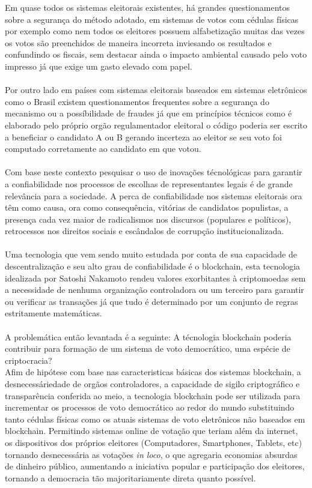 Em quase todos os sistemas eleitorais existentes, há grandes questionamentos sobre
a segurança do método adotado, em sistemas de votos com cédulas físicas por exemplo
como nem todos os eleitores possuem alfabetização muitas das vezes os votos são
preenchidos de maneira incorreta inviesando os resultados e confundindo os fiscais, 
sem destacar ainda o impacto ambiental causado pelo voto impresso já que exige
um gasto elevado com papel.\\ \\
Por outro lado em países com sistemas eleitorais baseados em sistemas eletrônicos
como o Brasil existem questionamentos frequentes sobre a segurança do mecanismo 
ou a possíbilidade de fraudes já que em princípios técnicos como é elaborado
pelo próprio orgão regulamentador eleitoral o código poderia ser escrito a 
beneficiar o candidato A ou B gerando incerteza ao eleitor se seu voto
foi computado corretamente ao candidato em que votou. \\ \\
Com base neste contexto pesquisar o uso de inovações técnológicas para garantir a 
confiabilidade nos processos de escolhas de representantes legais é de grande relevância
para a sociedade. A perca de confiabilidade nos sistemas eleitorais ora têm como
causa, ora como consequência, vitórias de candidatos populistas, a presença cada
vez maior de radicalismos nos discursos (populares e políticos), retrocessos nos
direitos sociais e escândalos de corrupção institucionalizada. \\ \\
Uma tecnologia que vem sendo muito estudada por conta de sua capacidade de 
descentralização e seu alto grau de confiabilidade é o blockchain, esta tecnologia
idealizada por Satoshi Nakamoto \cite[Bitcoin P2P e-cash paper]{nakamoto2008re}
rendeu valores exorbitantes à criptomoedas sem a necessidade de nenhuma organização
controladora ou um terceiro para garantir ou verificar as transações já que tudo
é determinado por um conjunto de regras estritamente matemáticas. \\ \\
A problemática então levantada é a seguinte: A técnologia blockchain poderia contribuir
para formação de um sistema de voto democrático, uma espécie de criptocracia? \\ 
Afim de hipótese com base nas caracteristicas básicas dos sistemas blockchain, 
a desnecessáriedade de orgãos controladores, a capacidade de sigilo criptográfico
e transparência conferida ao meio, a tecnologia blockchain pode ser
utilizada para incrementar os processos de voto democrático ao redor do mundo 
substituindo tanto cédulas físicas como os atuais sistemas de voto eletrônicos 
não baseados em blockchain. Permitindo sistemas online de votação que teriam 
além da internet, os dispositivos dos próprios eleitores (Computadores, Smartphones, 
Tablets, etc) tornando desnecessária as votações  \textit{in loco}, o que agregaria 
economias absurdas de dinheiro público, aumentando a iniciativa popular e participação dos eleitores, tornando a democracia tão 
majoritariamente direta quanto possível. \\ \\
